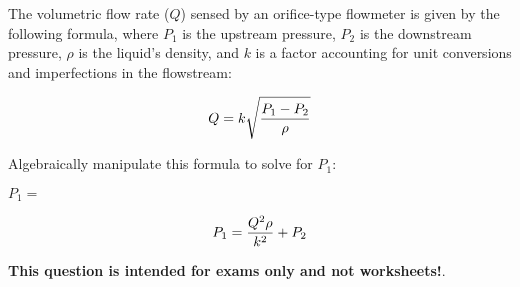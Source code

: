 

The volumetric flow rate ($Q$) sensed by an orifice-type flowmeter is given by the following formula, where $P_1$ is the upstream pressure, $P_2$ is the downstream pressure, $\rho$ is the liquid's density, and $k$ is a factor accounting for unit conversions and imperfections in the flowstream:
 
$$Q = k \sqrt{{P_1 - P_2} \over \rho}$$

Algebraically manipulate this formula to solve for $P_1$:

\vskip 20pt

$P_1 = $







$$P_1 = {Q^2 \rho \over k^2} + P_2$$







{\bf This question is intended for exams only and not worksheets!}.



